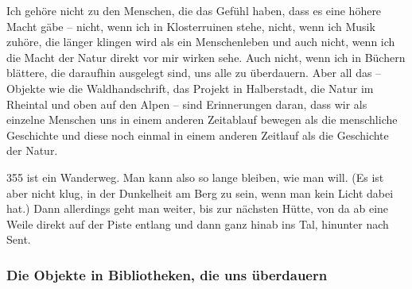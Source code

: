 \documentclass[a4paper,
fontsize=11pt,
oneside,
numbers=noperiodatend,
parskip=half-,
bibliography=totoc,
final
]{scrartcl}
\begin{document}
Ich gehöre nicht zu den Menschen, die das Gefühl haben, dass es eine
höhere Macht gäbe -- nicht, wenn ich in Klosterruinen stehe, nicht, wenn
ich Musik zuhöre, die länger klingen wird als ein Menschenleben und auch
nicht, wenn ich die Macht der Natur direkt vor mir wirken sehe. Auch
nicht, wenn ich in Büchern blättere, die daraufhin ausgelegt sind, uns
alle zu überdauern. Aber all das -- Objekte wie die Waldhandschrift, das
Projekt in Halberstadt, die Natur im Rheintal und oben auf den Alpen --
sind Erinnerungen daran, dass wir als einzelne Menschen uns in einem
anderen Zeitablauf bewegen als die menschliche Geschichte und diese noch
einmal in einem anderen Zeitlauf als die Geschichte der Natur.

355 ist ein Wanderweg. Man kann also so lange bleiben, wie man will. (Es
ist aber nicht klug, in der Dunkelheit am Berg zu sein, wenn man kein
Licht dabei hat.) Dann allerdings geht man weiter, bis zur nächsten
Hütte, von da ab eine Weile direkt auf der Piste entlang und dann ganz
hinab ins Tal, hinunter nach Sent.

\subsubsection{Die Objekte in Bibliotheken, die uns
überdauern}\label{die-objekte-in-bibliotheken-die-uns-uxfcberdauern}
\end{document}
